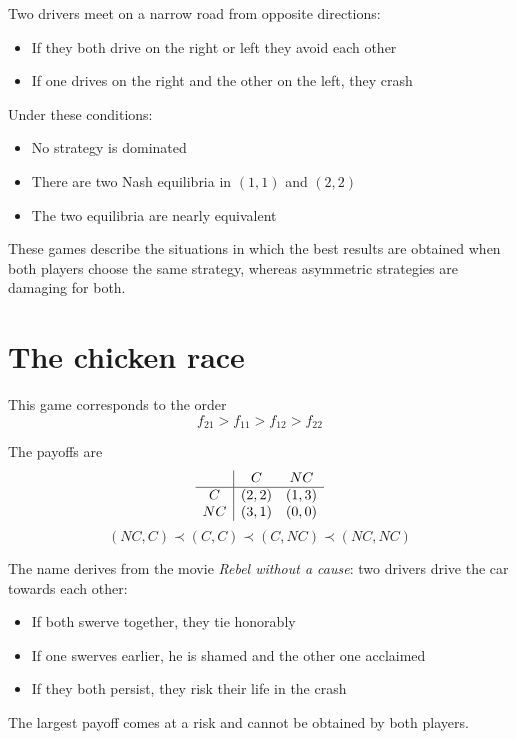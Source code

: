 Two drivers meet on a narrow road from opposite directions: 
\begin{itemize}
	\item If they both drive on the right or left they avoid each other
	
	\item If one drives on the right and the other on the left, they crash
\end{itemize}

Under these conditions: 
\begin{itemize}
	\item No strategy is dominated
	
	\item There are two Nash equilibria in $(1,1)$ and $(2,2)$
	
	\item The two equilibria are nearly equivalent
\end{itemize}

These games describe the situations in which the best results are obtained when both players choose the same strategy, whereas asymmetric strategies are damaging for both.

\section{The chicken race}

This game corresponds to the order 
$$ f_{21} > f_{11} > f_{12} > f_{22} $$

The payoffs are
$$
\begin{array}{c | c c}
	& C & NC \\
	\hline
	C & (2,2) & (1, 3) \\
	NC & (3,1) & (0,0)
\end{array}
$$
$$ (NC, C) \prec (C, C) \prec (C, NC) \prec (NC, NC) $$

The name derives from the movie \textit{Rebel without a cause}: two drivers drive the car towards each other:
\begin{itemize}
	\item If both swerve together, they tie honorably
	
	\item If one swerves earlier, he is shamed and the other one acclaimed
	
	\item If they both persist, they risk their life in the crash
\end{itemize}

The largest payoff comes at a risk and cannot be obtained by both players.

